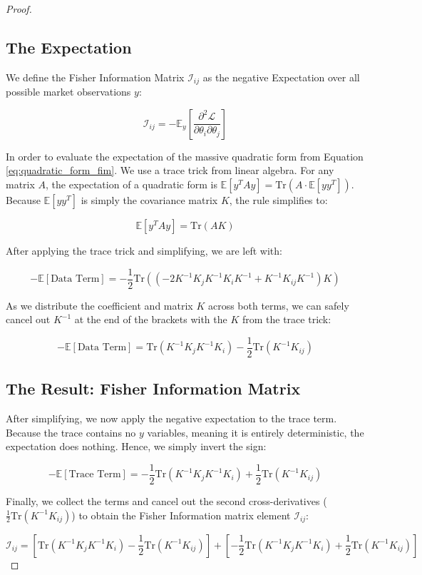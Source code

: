 \documentclass[12pt,oneside]{report}
\theoremstyle{definition}
\theoremstyle{remark}
\begin{document}
\begin{proof}
\subsection{The Expectation}
We define the Fisher Information Matrix $\mathcal{I}_{ij}$ as the negative Expectation over all possible market observations $y$:

$$\mathcal{I}_{ij} = -\mathbb{E}_y \left[ \frac{\partial^2 \mathcal{L}}{\partial \theta_i \partial \theta_j} \right]$$

In order to evaluate the expectation of the massive quadratic form from Equation \ref{eq:quadratic_form_fim}. We use a trace trick from linear algebra. For any matrix $A$, the expectation of a quadratic form is $\mathbb{E}[y^T A y] = \text{Tr}(A \cdot \mathbb{E}[yy^T])$.
Because $\mathbb{E}[yy^T]$ is simply the covariance matrix $K$, the rule simplifies to:

$$\mathbb{E}[y^T A y] = \text{Tr}(A K)$$

After applying the trace trick and simplifying, we are left with:

$$-\mathbb{E} [\text{Data Term}] = -\frac{1}{2} \text{Tr}\left( \left( -2 K^{-1} K_j K^{-1} K_i K^{-1} + K^{-1} K_{ij} K^{-1} \right) K \right)$$

As we distribute the coefficient and matrix $K$ across both terms, we can safely cancel out $K^{-1}$ at the end of the brackets with the $K$ from the trace trick:

$$-\mathbb{E} [\text{Data Term}] = \text{Tr}(K^{-1} K_j K^{-1} K_i) - \frac{1}{2} \text{Tr}(K^{-1} K_{ij})$$

\subsection{The Result: Fisher Information Matrix}
After simplifying, we now apply the negative expectation to the trace term. Because the trace contains no $y$ variables, meaning it is entirely deterministic, the expectation does nothing. Hence, we simply invert the sign:

$$-\mathbb{E} [\text{Trace Term}] = -\frac{1}{2} \text{Tr}(K^{-1} K_j K^{-1} K_i) + \frac{1}{2} \text{Tr}(K^{-1} K_{ij})$$

Finally, we collect the terms and cancel out the second cross-derivatives ($\frac{1}{2} \text{Tr}(K^{-1} K_{ij})$) to obtain the Fisher Information matrix element $\mathcal{I}_{ij}$:

$$\mathcal{I}_{ij} = \left[ \text{Tr}(K^{-1} K_j K^{-1} K_i) - \frac{1}{2} \text{Tr}(K^{-1} K_{ij}) \right] + \left[ -\frac{1}{2} \text{Tr}(K^{-1} K_j K^{-1} K_i) + \frac{1}{2} \text{Tr}(K^{-1} K_{ij}) \right]$$


\end{proof}
\end{document}
